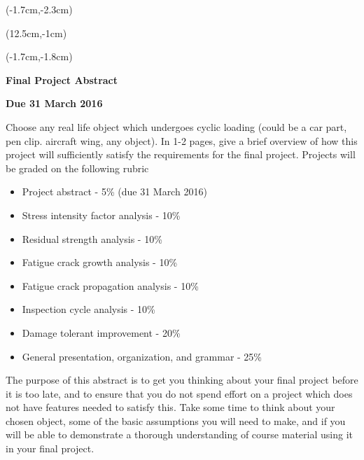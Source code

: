 \documentclass[12pt, oneside]{article}
\begin{document}


\begin{textblock*}{4cm}(-1.7cm,-2.3cm)
\end{textblock*}

\begin{textblock*}{8cm}(12.5cm,-1cm)
\end{textblock*}
\begin{textblock*}{13.5cm}(-1.7cm,-1.8cm)
\end{textblock*}

\vspace{1cm}

\begin{center}
\textbf{\Large Final Project Abstract}

\textbf{Due 31 March 2016}
\end{center}

Choose any real life object which undergoes cyclic loading (could be a car part, pen clip. aircraft wing, any object).
In 1-2 pages, give a brief overview of how this project will sufficiently satisfy the requirements for the final project.
Projects will be graded on the following rubric
\begin{itemize}
	\item Project abstract - 5\% (due 31 March 2016)
	\item Stress intensity factor analysis - 10\%
	\item Residual strength analysis - 10\%
	\item Fatigue crack growth analysis - 10\%
	\item Fatigue crack propagation analysis - 10\%
	\item Inspection cycle analysis - 10\%
	\item Damage tolerant improvement - 20\%
	\item General presentation, organization, and grammar - 25\%
\end{itemize}

The purpose of this abstract is to get you thinking about your final project before it is too late, and to ensure that you do not spend effort on a project which does not have features needed to satisfy this.
Take some time to think about your chosen object, some of the basic assumptions you will need to make, and if you will be able to demonstrate a thorough understanding of course material using it in your final project.
\end{document}
